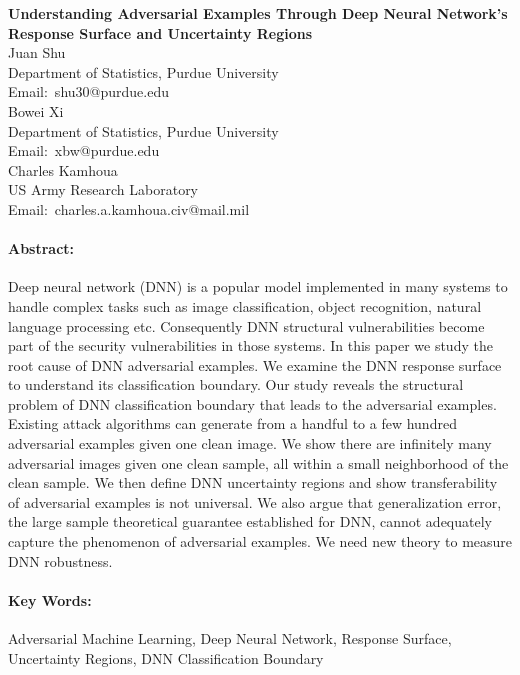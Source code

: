 \documentclass[12pt]{article}
\begin{document}
\pagestyle{empty}
\begin{center}
{\bf \large Understanding Adversarial Examples Through Deep Neural
  Network's \\[0.15in] Response Surface and Uncertainty Regions} \\[0.15in]
Juan Shu\\
Department of Statistics, Purdue University\\
Email:~shu30@purdue.edu\\[0.1in]
Bowei Xi \\
Department of Statistics, Purdue University\\
Email:~xbw@purdue.edu \\[0.1in]
Charles Kamhoua \\
US Army Research Laboratory \\
Email:~charles.a.kamhoua.civ@mail.mil
\end{center}



\paragraph{Abstract:}
Deep neural network (DNN) is a popular model implemented in many  
systems to handle complex tasks such as image classification, object
recognition, natural language processing etc. 
Consequently DNN structural vulnerabilities become part of the security
vulnerabilities in those systems. 
In this paper we study the root cause of DNN adversarial examples. 
We examine the DNN response surface
to understand its classification boundary. Our study reveals the
structural problem of DNN classification boundary that leads to the adversarial
examples. Existing attack algorithms can generate from a handful
to a few hundred adversarial examples given one clean image. We show
there are infinitely many adversarial images given one clean
sample, all within a small neighborhood of the clean
sample. We then define DNN uncertainty regions and show
transferability of adversarial examples is not universal. We also argue that
generalization error, the large sample 
theoretical guarantee established for DNN, cannot adequately capture the phenomenon of
adversarial examples. We need new theory to measure DNN robustness.  
 
  
\paragraph{Key Words:}
Adversarial Machine Learning, Deep Neural
Network, Response Surface, Uncertainty Regions, DNN Classification Boundary
 
\end{document}
